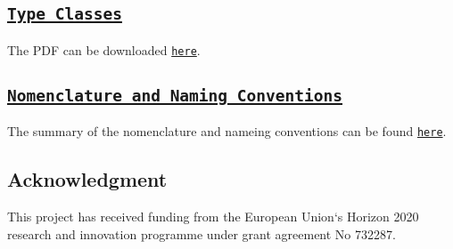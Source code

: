 \subsection*{\href{../pdf/TypeClassesOverview_x2.pdf}{\tt Type Classes} }

The P\+DF can be downloaded \href{../pdf/TypeClassesOverview_x2.pdf}{\tt here}.



\subsection*{\href{../pdf/naming_conventions.pdf}{\tt Nomenclature and Naming Conventions} }

The summary of the nomenclature and nameing conventions can be found \href{../pdf/naming_conventions.pdf}{\tt here}.

\subsection*{Acknowledgment }

This project has received funding from the European Union‘s Horizon 2020 research and innovation programme under grant agreement No 732287. 